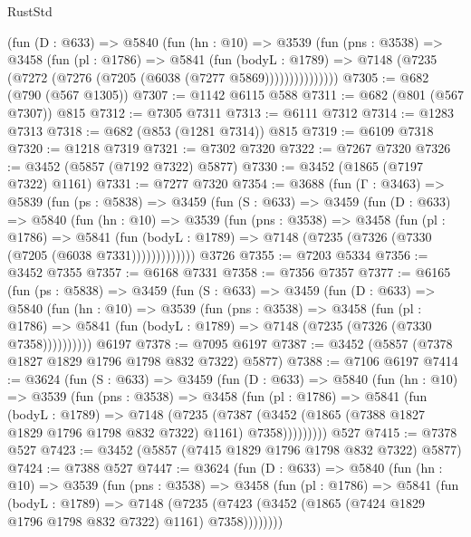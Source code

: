\begin{lexlean}{RustStd}
\begin{coremodule}
            (fun (D : @633) =>
            @5840
              (fun (hn : @10) =>
              @3539
                (fun (pns : @3538) =>
                @3458
                  (fun (pl : @1786) =>
                  @5841
                    (fun (bodyL : @1789) =>
                    @7148 (@7235 (@7272 (@7276 (@7205 (@6038 (@7277 @5869)))))))))))))))
@7305 := @682 (@790 (@567 @1305))
@7307 := @1142 @6115 @588
@7311 := @682 (@801 (@567 @7307)) @815
@7312 := @7305 @7311
@7313 := @6111 @7312
@7314 := @1283 @7313
@7318 := @682 (@853 (@1281 @7314)) @815
@7319 := @6109 @7318
@7320 := @1218 @7319
@7321 := @7302 @7320
@7322 := @7267 @7320
@7326 := @3452 (@5857 (@7192 @7322) @5877)
@7330 := @3452 (@1865 (@7197 @7322) @1161)
@7331 := @7277 @7320
@7354 := @3688
    (fun (Γ : @3463) =>
    @5839
      (fun (ps : @5838) =>
      @3459
        (fun (S : @633) =>
        @3459
          (fun (D : @633) =>
          @5840
            (fun (hn : @10) =>
            @3539
              (fun (pns : @3538) =>
              @3458
                (fun (pl : @1786) =>
                @5841
                  (fun (bodyL : @1789) =>
                  @7148 (@7235 (@7326 (@7330 (@7205 (@6038 @7331)))))))))))))
    @3726
@7355 := @7203 @5334
@7356 := @3452 @7355
@7357 := @6168 @7331
@7358 := @7356 @7357
@7377 := @6165
    (fun (ps : @5838) =>
    @3459
      (fun (S : @633) =>
      @3459
        (fun (D : @633) =>
        @5840
          (fun (hn : @10) =>
          @3539
            (fun (pns : @3538) =>
            @3458
              (fun (pl : @1786) =>
              @5841 (fun (bodyL : @1789) => @7148 (@7235 (@7326 (@7330 @7358))))))))))
    @6197
@7378 := @7095 @6197
@7387 := @3452 (@5857 (@7378 @1827 @1829 @1796 @1798 @832 @7322) @5877)
@7388 := @7106 @6197
@7414 := @3624
    (fun (S : @633) =>
    @3459
      (fun (D : @633) =>
      @5840
        (fun (hn : @10) =>
        @3539
          (fun (pns : @3538) =>
          @3458
            (fun (pl : @1786) =>
            @5841
              (fun (bodyL : @1789) =>
              @7148
                (@7235
                  (@7387
                    (@3452 (@1865 (@7388 @1827 @1829 @1796 @1798 @832 @7322) @1161) @7358)))))))))
    @527
@7415 := @7378 @527
@7423 := @3452 (@5857 (@7415 @1829 @1796 @1798 @832 @7322) @5877)
@7424 := @7388 @527
@7447 := @3624
    (fun (D : @633) =>
    @5840
      (fun (hn : @10) =>
      @3539
        (fun (pns : @3538) =>
        @3458
          (fun (pl : @1786) =>
          @5841
            (fun (bodyL : @1789) =>
            @7148
              (@7235 (@7423 (@3452 (@1865 (@7424 @1829 @1796 @1798 @832 @7322) @1161) @7358))))))))

\end{coremodule}
\end{lexlean}
